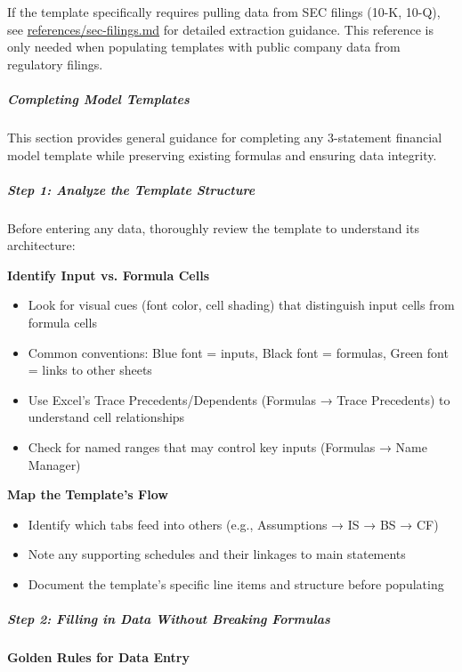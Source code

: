 \documentclass[11pt]{article}
\begin{document}
If the template specifically requires pulling data from SEC filings (10-K, 10-Q), see \href{references/sec-filings.md}{references/sec-filings.md} for detailed extraction guidance. This reference is only needed when populating templates with public company data from regulatory filings.


\subparagraph{Completing Model Templates}\mbox{}\par

This section provides general guidance for completing any 3-statement financial model template while preserving existing formulas and ensuring data integrity.


\subparagraph{Step 1: Analyze the Template Structure}\mbox{}\par

Before entering any data, thoroughly review the template to understand its architecture:


\textbf{Identify Input vs. Formula Cells}

\begin{itemize}[leftmargin=*,itemsep=2pt,topsep=2pt]
\item {} Look for visual cues (font color, cell shading) that distinguish input cells from formula cells
\item {} Common conventions: Blue font = inputs, Black font = formulas, Green font = links to other sheets
\item {} Use Excel's Trace Precedents/Dependents (Formulas → Trace Precedents) to understand cell relationships
\item {} Check for named ranges that may control key inputs (Formulas → Name Manager)
\end{itemize}

\textbf{Map the Template's Flow}

\begin{itemize}[leftmargin=*,itemsep=2pt,topsep=2pt]
\item {} Identify which tabs feed into others (e.g., Assumptions → IS → BS → CF)
\item {} Note any supporting schedules and their linkages to main statements
\item {} Document the template's specific line items and structure before populating
\end{itemize}

\subparagraph{Step 2: Filling in Data Without Breaking Formulas}\mbox{}\par

\textbf{Golden Rules for Data Entry}
\end{document}
